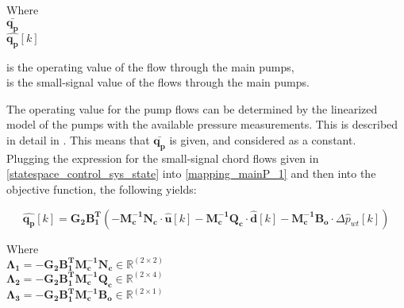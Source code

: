 \begin{minipage}[t]{0.20\textwidth}
Where\\
\hspace*{8mm} $ \bm{\bar{q_p}} $ \\
\hspace*{8mm} $ \bm{\hat{q_p}}[k] $ 
\end{minipage}
\begin{minipage}[t]{0.68\textwidth}
\vspace*{2mm}
is the operating value of the flow through the main pumps, \\
is the small-signal value of the flows through the main pumps. 
\end{minipage} 

The operating value for the pump flows can be determined by the linearized model of the pumps with the available pressure measurements. This is described in detail in . This means that $\bm{\bar{q_p}}$ is given, and considered as a constant. 
\\
Plugging the expression for the small-signal chord flows given in \eqref{statespace_control_sys_state} into \eqref{mapping_mainP_1} and then into the objective function, the following yields:


 \begin{equation}
 \bm{\hat{q_{p}}}[k] =   \bm{G_{2}} \bm{B_{1}^T}(-\bm{M_c^{-1}}\bm{N_c} \cdot \bm{\hat{u}}[k] -\bm{M_c^{-1}}\bm{Q_c} \cdot \bm{\hat{d}}[k] -\bm{M_c^{-1}}\bm{B_{o}} \cdot \Delta \hat{p}_{wt}[k])   
 \label{mappingandstates}
\end{equation}

\begin{minipage}[t]{0.80\textwidth}
Where\\
\hspace*{8mm} $\bm{\Lambda_1} = -\bm{G_{2}} \bm{B_{1}^T}\bm{M_c^{-1}}\bm{N_c} \in \pmb{\mathbb{R}}^{(2 \times 2)}$ \\
\hspace*{8mm} $\bm{\Lambda_2} = -\bm{G_{2}} \bm{B_{1}^T}\bm{M_c^{-1}}\bm{Q_c} \in \pmb{\mathbb{R}}^{(2 \times 4)}$ \\
\hspace*{8mm} $\bm{\Lambda_3} = -\bm{G_{2}} \bm{B_{1}^T}\bm{M_c^{-1}}\bm{B_{o}} \in \pmb{\mathbb{R}}^{(2 \times 1)}$ 
\end{minipage}

